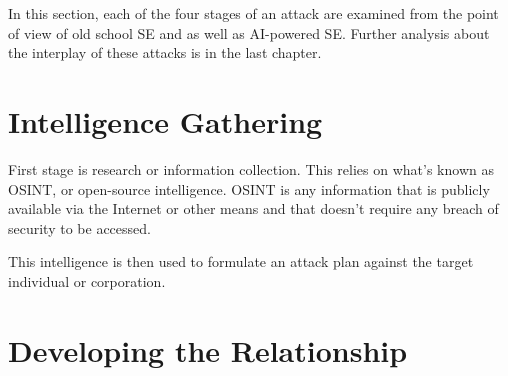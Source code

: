 In this section, each of the four stages of an attack are examined from the point of view of old school SE and as well as AI-powered SE. Further analysis about the interplay of these attacks is in the last chapter.





\section{Intelligence Gathering}
\begin{comment}
    
    - OSINT has been defined before
    - Cover the phase of intel gathering more broadly than just OSINT
    - Following and observing people entering and exiting premises
    - Calling the company for more information (after OSINT)
    - Use of pretexting in intel gathering

\end{comment}


First stage is research or information collection. This relies on what's known as OSINT, or open-source intelligence. OSINT is any information that is publicly available via the Internet or other means and that doesn't require any breach of security to be accessed.

This intelligence is then used to formulate an attack plan against the target individual or corporation.







\section{Developing the Relationship}
\begin{comment}
    
    - Engaging the target with the gathered info and fabricated pretext
    - Choosing the right timing
    - Practicing the engagement
    - Creating the strategy for engagement

\end{comment}


